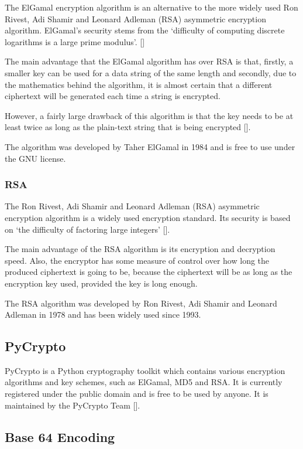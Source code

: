 The ElGamal encryption algorithm is an alternative to the more widely used  Ron Rivest, Adi
Shamir and Leonard Adleman (RSA) asymmetric encryption algorithm. ElGamal's security stems
from the `difficulty of computing discrete logarithms is a large prime modulus'.
[\cite{website:elgamal}]

The main advantage that the ElGamal algorithm has over RSA is that, firstly, a smaller key can
be used for a data string of the same length and secondly, due to the mathematics behind the
algorithm, it is almost certain that a different ciphertext will be generated each time a
string is encrypted.

However, a fairly large drawback of this algorithm is that the key needs to be at least twice
as long as the plain-text string that is being encrypted
[\cite{journal:elgamal}].

The algorithm was developed by Taher ElGamal in 1984 and is free to use under the GNU license.

\subsubsection{RSA}
\label{sec:rsa}

The Ron Rivest, Adi Shamir and Leonard Adleman (RSA) asymmetric encryption algorithm is a
widely used encryption standard. Its security is based on `the difficulty of factoring large 
integers' [\cite{website:elgamal}]. 

The main advantage of the RSA algorithm is its encryption and decryption speed. Also, the
encryptor has some measure of control over how long the produced ciphertext is going to be,
because the ciphertext will be as long as the encryption key used, provided the key is long
enough.

The RSA algorithm was developed by Ron Rivest, Adi Shamir and Leonard Adleman in 1978 and has
been widely used since 1993. 

\subsection{PyCrypto}

PyCrypto is a Python cryptography toolkit which contains various encryption algorithms and
key schemes, such as ElGamal, MD5 and RSA. It is currently registered under the public domain
and is free to be used by anyone. It is maintained by the PyCrypto Team
[\cite{website:pycrypto}].

\subsection{Base 64 Encoding}
\label{sec:base64}

